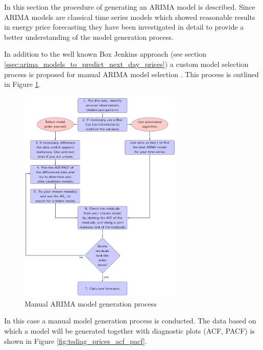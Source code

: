 In this section the procedure of generating an ARIMA model is described. Since ARIMA models are classical time series models which showed reasonable results in energy price forecasting \cite{aggarwal2009electricity,weron2005forecasting} they have been investigated in detail to provide a better understanding of the model generation process. 

In addition to the well known Box Jenkins approach (see section \ref{ssec:arima_models_to_predict_next_day_prices}) a custom model selection process is proposed for manual ARIMA model selection \cite{hyndman2012forecasting}. This process is outlined in Figure \ref{fig:manual_arima_forecasting_procedure}.

\begin{figure}[htbp]
	\centering
		\includegraphics[width=0.70\textwidth]{figures/forecasting/manual_arima_forecasting_procedure.png}
	\caption{Manual ARIMA model generation process \cite{hyndman2012forecasting}}
	\label{fig:manual_arima_forecasting_procedure}
\end{figure}

In this case a manual model generation process is conducted. The data based on which a model will be generated together with diagnostic plots (ACF, PACF) is shown in Figure \ref{fig:tsdiag_prices_acf_pacf}. 

